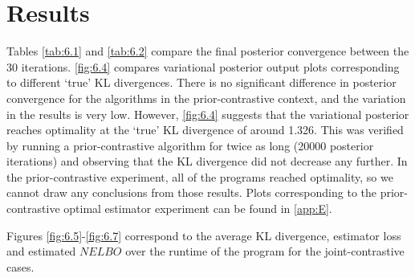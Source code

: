 \documentclass[honours,12pt]{unswthesis}
\numberwithin{equation}{section}
\theoremstyle{definition}
\begin{document}
\section{Results}
Tables \ref{tab:6.1} and \ref{tab:6.2} compare the final posterior convergence between the 30 iterations. \autoref{fig:6.4} compares variational posterior output plots corresponding to different `true' KL divergences. There is no significant difference in posterior convergence for the algorithms in the prior-contrastive context, and the variation in the results is very low. However, \autoref{fig:6.4} suggests that the variational posterior reaches optimality at the `true' KL divergence of around 1.326. This was verified by running a prior-contrastive algorithm for twice as long (20000 posterior iterations) and observing that the KL divergence did not decrease any further. In the prior-contrastive experiment, all of the programs reached optimality, so we cannot draw any conclusions from those results. Plots corresponding to the prior-contrastive optimal estimator experiment can be found in \autoref{app:E}.

Figures \ref{fig:6.5}-\ref{fig:6.7} correspond to the average KL divergence, estimator loss and estimated $NELBO$ over the runtime of the program for the joint-contrastive cases.
\end{document}
